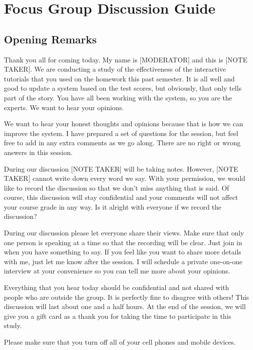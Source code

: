\chapter[Focus Group Discussion Guide]{Focus Group Discussion Guide}

\section{Opening Remarks}

Thank you all for coming today. My name is [MODERATOR] and this is [NOTE TAKER]. We are conducting a study of the effectiveness of the interactive tutorials that you used on the homework this past semester. It is all well and good to update a system based on the test scores, but obviously, that only tells part of the story. You have all been working with the system, so you are the experts. We want to hear your opinions.

We want to hear your honest thoughts and opinions because that is how we can improve the system. I have prepared a set of questions for the session, but feel free to add in any extra comments as we go along. There are no right or wrong answers in this session.

During our discussion [NOTE TAKER] will be taking notes. However, [NOTE TAKER] cannot write down every word we say. With your permission, we would like to record the discussion so that we don’t miss anything that is said. Of course, this discussion will stay confidential and your comments will not affect your course grade in any way. Is it alright with everyone if we record the discussion?

During our discussion please let everyone share their views. Make sure that only one person is speaking at a time so that the recording will be clear. Just join in when you have something to say. If you feel like you want to share more details with me, just let me know after the session. I will schedule a private one-on-one interview at your convenience so you can tell me more about your opinions.

Everything that you hear today should be confidential and not shared with people who are outside the group. It is perfectly fine to disagree with others! This discussion will last about one and a half hours. At the end of the session, we will give you a gift card as a thank you for taking the time to participate in this study.

Please make sure that you turn off all of your cell phones and mobile devices.

